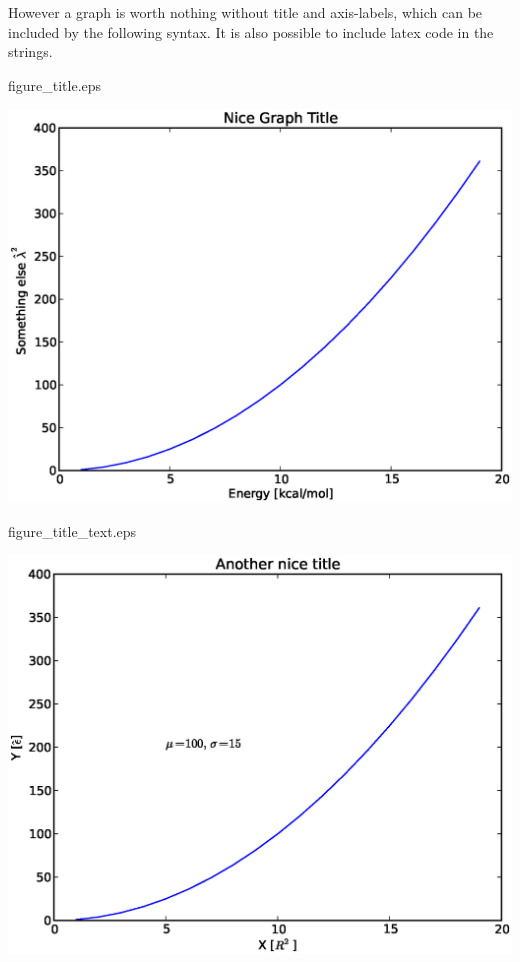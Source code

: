 \documentclass{article}
\begin{document}
However a graph is worth nothing without title and axis-labels,
which can be included by the following syntax.
It is also possible to include latex code in the strings.

\begin{multicols}{2}

    

\columnbreak

    \centering

    figure\_title.eps

    \includegraphics[width=1.0\linewidth]{py/figure_title.eps}

    figure\_title\_text.eps

    \includegraphics[width=1.0\linewidth]{py/figure_title_text.eps}

\end{multicols}
\end{document}
